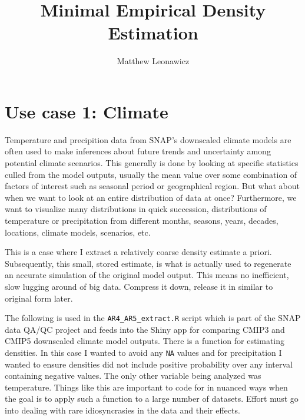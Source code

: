 \documentclass{article}\usepackage[]{graphicx}\usepackage[]{color}
\begin{document}
\title{Minimal Empirical Density Estimation}
\author{Matthew Leonawicz}
\maketitle






\section{Use case 1: Climate}
Temperature and precipition data from SNAP's downscaled climate models are often used to make inferences about future trends and uncertainty among potential climate scenarios.
This generally is done by looking at specific statistics culled from the model outputs, usually the mean value over some combination of factors of interest such as seasonal period or geographical region.
But what about when we want to look at an entire distribution of data at once?
Furthermore, we want to visualize many distributions in quick succession, distributions of temperature or precipitation from different months, seasons, years, decades, locations, climate models, scenarios, etc.

This is a case where I extract a relatively coarse density estimate a priori.
Subsequently, this small, stored estimate, is what is actually used to regenerate an accurate simulation of the original model output.
This means no inefficient, slow lugging around of big data.
Compress it down, release it in similar to original form later.

The following is used in the \texttt{AR4\_AR5\_extract.R} script which is part of the SNAP data QA/QC project and feeds into the Shiny app for comparing CMIP3 and CMIP5 downscaled climate model outputs.
There is a function for estimating densities.
In this case I wanted to avoid any \texttt{NA} values and for precipitation I wanted to ensure densities did not include positive probability over any interval containing negative values.
The only other variable being analyzed was temperature.
Things like this are important to code for in nuanced ways when the goal is to apply such a function to a large number of datasets.
Effort must go into dealing with rare idiosyncrasies in the data and their effects.
\end{document}
